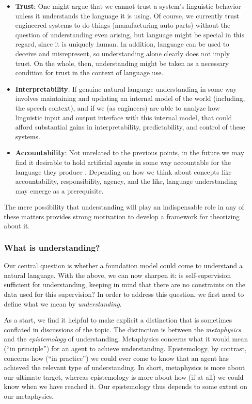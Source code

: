\begin{itemize}
    \item \textbf{Trust}: One might argue that we cannot trust a system’s linguistic behavior unless it understands the language it is using. Of course, we currently trust engineered systems to do things (\eg manufacturing auto parts) without the question of understanding even arising, but language might be special in this regard, since it is uniquely human. In addition, language can be used to deceive and misrepresent, so understanding alone clearly does not imply trust. On the whole, then, understanding might be taken as a necessary condition for trust in the context of language use.
    \item \textbf{Interpretability}: If genuine natural language understanding in some way involves maintaining and updating an internal model of the world (including, \eg the speech context), and if we (as engineers) are able to analyze how linguistic input and output interface with this internal model, that could afford substantial gains in interpretability, predictability, and control of these systems.
    \item \textbf{Accountability}: Not unrelated to the previous points, in the future we may find it desirable to hold artificial agents in some way accountable for the language they produce \citep{thehaiadaptiveagentsgroup2021when}. Depending on how we think about concepts like accountability, responsibility, agency, and the like, language understanding may emerge as a prerequisite.
\end{itemize}

\noindent The mere possibility that understanding will play an indispensable role in any of these matters provides strong motivation to develop a framework for theorizing about it. 

\subsubsection{What is understanding?}

Our central question is whether a foundation model could come to understand a natural language. With the above, we can now sharpen it: is self-supervision sufficient for understanding, keeping in mind that there are no constraints on the data used for this supervision? In order to address this question, we first need to define what we mean by \textit{understanding}.

As a start, we find it helpful to make explicit a distinction that is sometimes conflated in discussions of the topic. The distinction is between the \textit{metaphysics} and the \textit{epistemology} of understanding. Metaphysics concerns what it would mean (“in principle”) for an agent to achieve understanding. Epistemology, by contrast, concerns how (“in practice”) we could ever come to know that an agent has achieved the relevant type of understanding. In short, metaphysics is more about our ultimate target, whereas epistemology is more about how (if at all) we could know when we have reached it. Our epistemology thus depends to some extent on our metaphysics. 

